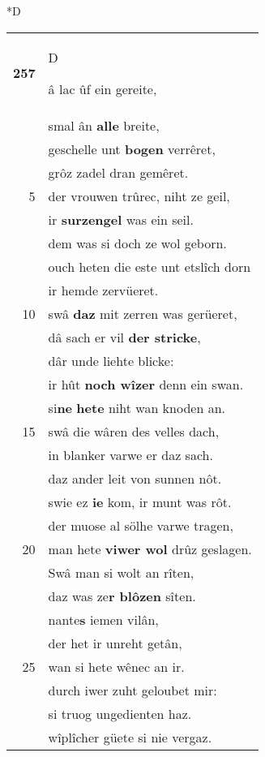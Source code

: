 \documentclass[8pt,a4paper,notitlepage]{article}
\begin{document}
\begin{table}[ht]
\begin{minipage}[t]{0.5\linewidth}
\small
\begin{center}*D
\end{center}
\begin{tabular}{rl}
\textbf{257} & \begin{large}D\end{large}â lac ûf ein gereite,\\ 
 & smal ân \textbf{alle} breite,\\ 
 & geschelle unt \textbf{bogen} verrêret,\\ 
 & grôz zadel dran gemêret.\\ 
5 & der vrouwen trûrec, niht ze geil,\\ 
 & ir \textbf{surzengel} was ein seil.\\ 
 & dem was si doch ze wol geborn.\\ 
 & ouch heten die este unt etslîch dorn\\ 
 & ir hemde zervüeret.\\ 
10 & swâ \textbf{daz} mit zerren was gerüeret,\\ 
 & dâ sach er vil \textbf{der stricke},\\ 
 & dâr unde liehte blicke:\\ 
 & ir hût \textbf{noch wîzer} denn ein swan.\\ 
 & si\textbf{ne} \textbf{hete} niht wan knoden an.\\ 
15 & swâ die wâren des velles dach,\\ 
 & in blanker varwe er daz sach.\\ 
 & daz ander leit von sunnen nôt.\\ 
 & swie ez \textbf{ie} kom, ir munt was rôt.\\ 
 & der muose al sölhe varwe tragen,\\ 
20 & man hete \textbf{viwer wol} drûz geslagen.\\ 
 & Swâ man si wolt an rîten,\\ 
 & daz was ze\textbf{r blôzen} sîten.\\ 
 & nante\textbf{s} iemen vilân,\\ 
 & der het ir unreht getân,\\ 
25 & wan si hete wênec an ir.\\ 
 & durch iwer zuht geloubet mir:\\ 
 & si truog ungedienten haz.\\ 
 & wîplîcher güete si nie vergaz.\\ 

\end{tabular}
\end{minipage}
\end{table}
\end{document}
